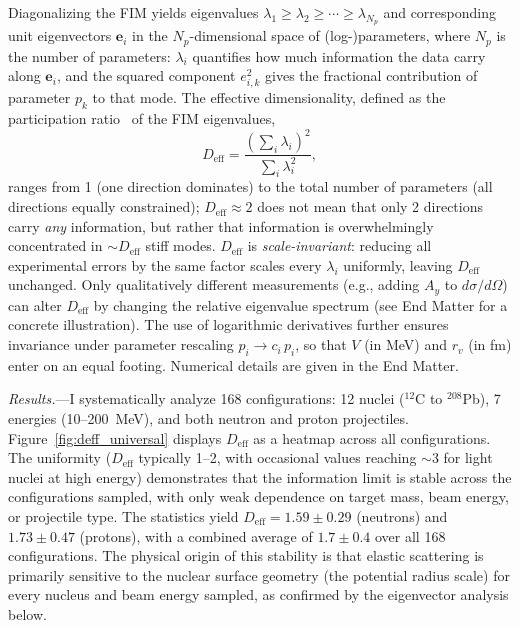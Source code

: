 \documentclass[aps,prl,reprint,superscriptaddress,showpacs,floatfix]{revtex4-2}
\begin{document}
Diagonalizing the FIM yields eigenvalues $\lambda_1 \geq \lambda_2 \geq \cdots \geq \lambda_{N_p}$ and corresponding unit eigenvectors $\mathbf{e}_i$ in the $N_p$-dimensional space of (log-)parameters, where $N_p$ is the number of parameters: $\lambda_i$ quantifies how much information the data carry along $\mathbf{e}_i$, and the squared component $e_{i,k}^2$ gives the fractional contribution of parameter $p_k$ to that mode. The effective dimensionality, defined as the participation ratio~\cite{Bell1970,Gutenkunst2007} of the FIM eigenvalues,
\begin{equation}
D_\mathrm{eff} = \frac{(\sum_i \lambda_i)^2}{\sum_i \lambda_i^2},
\end{equation}
ranges from 1 (one direction dominates) to the total number of parameters (all directions equally constrained); $D_\mathrm{eff} \approx 2$ does not mean that only 2 directions carry \emph{any} information, but rather that information is overwhelmingly concentrated in $\sim$$D_\mathrm{eff}$ stiff modes. $D_\mathrm{eff}$ is \emph{scale-invariant}: reducing all experimental errors by the same factor scales every $\lambda_i$ uniformly, leaving $D_\mathrm{eff}$ unchanged. Only qualitatively different measurements (e.g., adding $A_y$ to $d\sigma/d\Omega$) can alter $D_\mathrm{eff}$ by changing the relative eigenvalue spectrum (see End Matter for a concrete illustration). The use of logarithmic derivatives further ensures invariance under parameter rescaling $p_i \to c_i\,p_i$, so that $V$ (in MeV) and $r_v$ (in fm) enter on an equal footing. Numerical details are given in the End Matter.

\textit{Results.}---I systematically analyze 168 configurations: 12 nuclei ($^{12}$C to $^{208}$Pb), 7 energies (10--200~MeV), and both neutron and proton projectiles. Figure~\ref{fig:deff_universal} displays $D_\mathrm{eff}$ as a heatmap across all configurations. The uniformity ($D_\mathrm{eff}$ typically 1--2, with occasional values reaching $\sim$3 for light nuclei at high energy) demonstrates that the information limit is stable across the configurations sampled, with only weak dependence on target mass, beam energy, or projectile type. The statistics yield $D_\mathrm{eff} = 1.59 \pm 0.29$ (neutrons) and $1.73 \pm 0.47$ (protons), with a combined average of $1.7 \pm 0.4$ over all 168 configurations. The physical origin of this stability is that elastic scattering is primarily sensitive to the nuclear surface geometry (the potential radius scale) for every nucleus and beam energy sampled, as confirmed by the eigenvector analysis below.
\end{document}
